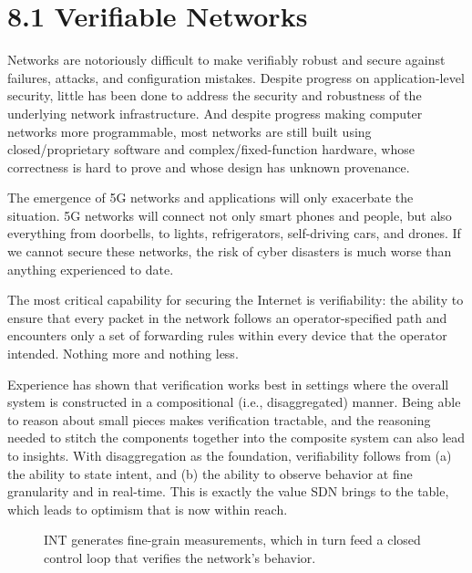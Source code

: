 \documentclass[letterpaper,11pt,english]{sphinxmanual}
\let\sphinxpxdimen\pdfpxdimen\else\newdimen\sphinxpxdimen
\begin{document}
\section{8.1 Verifiable Networks}
\label{\detokenize{future:verifiable-networks}}
Networks are notoriously difficult to make verifiably robust and
secure against failures, attacks, and configuration mistakes. Despite
progress on application-level security, little has been done to
address the security and robustness of the underlying network
infrastructure. And despite progress making computer networks more
programmable, most networks are still built using closed/proprietary
software and complex/fixed-function hardware, whose correctness is
hard to prove and whose design has unknown provenance.

The emergence of 5G networks and applications will only exacerbate the
situation. 5G networks will connect not only smart phones and people,
but also everything from doorbells, to lights, refrigerators,
self-driving cars, and drones. If we cannot secure these networks, the
risk of cyber disasters is much worse than anything experienced to
date.

The most critical capability for securing the Internet is verifiability:
the ability to ensure that every packet in the network follows an
operator-specified path and encounters only a set of forwarding rules
within every device that the operator intended. Nothing more and
nothing less.

Experience has shown that verification works best in settings where
the overall system is constructed in a compositional (i.e.,
disaggregated) manner. Being able to reason about small pieces makes
verification tractable, and the reasoning needed to stitch the
components together into the composite system can also lead to
insights. With disaggregation as the foundation, verifiability follows
from (a) the ability to state intent, and (b) the ability to observe
behavior at fine granularity and in real-time. This is exactly the
value SDN brings to the table, which leads to optimism that
 is now within reach.

\begin{figure}[htbp]
\centering
\capstart

\noindent\sphinxincludegraphics[width=600\sphinxpxdimen]{{Slide30}.png}
\caption{INT generates fine-grain measurements, which in turn feed a closed
control loop that verifies the network’s behavior.}\label{\detokenize{future:id4}}\label{\detokenize{future:fig-closed-loop}}\end{figure}
\end{document}
